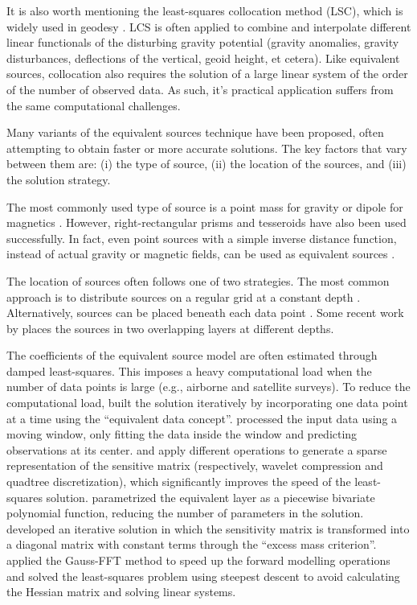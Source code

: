 It is also worth mentioning the least-squares collocation method
(LSC), which is widely used in geodesy
\citep[][and references therein]{tscherning2015}.
LCS is often applied to combine and interpolate different linear functionals of
the disturbing gravity potential (gravity anomalies, gravity disturbances,
deflections of the vertical, geoid height, et cetera).
Like equivalent sources, collocation also requires the solution of a large
linear system of the order of the number of observed data.
As such, it's practical application suffers from the same computational
challenges.

Many variants of the equivalent sources technique have been proposed, often
attempting to obtain faster or more accurate solutions.
The key factors that vary between them are: (i) the type of source, (ii)
the location of the sources, and (iii) the solution strategy.

The most commonly used type of source is a point mass for gravity or dipole for
magnetics \citep[e.g.,~][]{vonfrese1981, silva1986, mendonca1994,
siqueira2017}.
However, right-rectangular prisms \citep[e.g.,][]{barnes2011, jirigalatu2019,
li2020} and tesseroids \citep{bouman2016} have also been used successfully.
In fact, even point sources with a simple inverse distance function, instead of
actual gravity or magnetic fields, can be used as
equivalent sources \citep{cordell1992}.

The location of sources often follows one of two strategies.
The most common approach is to distribute sources on a regular grid at a
constant depth \citep[e.g.,~][]{leao1989, barnes2011, oliveira2013}.
Alternatively, sources can be placed beneath each data point
\citep[e.g.,~][]{cordell1992, siqueira2017}.
Some recent work by \citet{li2020} places the sources in two overlapping layers
at different depths.

The coefficients of the equivalent source model are often estimated through
damped least-squares.
This imposes a heavy computational load when the number of data points is
large (e.g., airborne and satellite surveys).
To reduce the computational load, \citet{mendonca1994} built the solution
iteratively by incorporating one data point at a time using the ``equivalent
data concept''.
\citet{leao1989} processed the input data using a moving window, only fitting the
data inside the window and predicting observations at its center.
\citet{li2010} and \citet{barnes2011} apply different operations to generate a
sparse representation of the sensitive matrix (respectively, wavelet
compression and quadtree discretization), which significantly improves the
speed of the least-squares solution.
\citet{oliveira2013} parametrized the equivalent layer as a piecewise bivariate
polynomial function, reducing the number of parameters in the solution.
\citet{siqueira2017} developed an iterative solution in which the sensitivity
matrix is transformed into a diagonal matrix with constant terms through the
``excess mass criterion''.
\citet{jirigalatu2019} applied the Gauss-FFT method to speed up the forward
modelling operations and solved the least-squares problem using steepest
descent to avoid calculating the Hessian matrix and solving linear systems.

